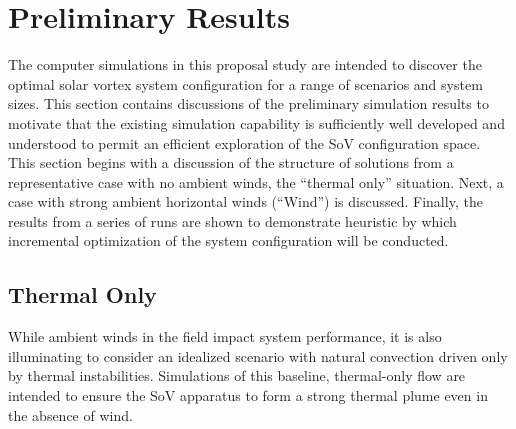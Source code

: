  
\section{Preliminary Results}
\label{sec:results}

%
%
%
%

The computer simulations in this proposal study are intended to discover
the optimal solar vortex system configuration for a range of scenarios
and system sizes. 
This section contains discussions of the preliminary simulation results 
to motivate that the existing simulation capability is sufficiently well
developed and understood to permit an efficient exploration of the SoV
configuration space. 
This section begins with a discussion of the structure of solutions from
a representative case with no ambient winds, the ``thermal only''
situation. Next, a case with strong ambient horizontal winds (``Wind'')
is discussed. Finally, the results from a series of runs are shown to
demonstrate heuristic by which incremental optimization of the system
configuration will be conducted. 



\subsection{Thermal Only}

While ambient winds in the field impact system performance, it is
also illuminating to consider an idealized scenario with natural convection
driven only by thermal instabilities. Simulations of this baseline,
thermal-only flow are intended to ensure the SoV apparatus to form a
strong thermal plume even in the absence of wind. 

